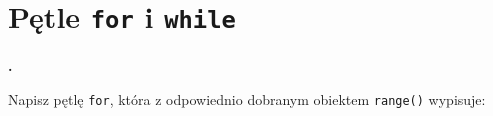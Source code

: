 \documentclass[a4paper]{article}
\begin{document}



















\section{Pętle \texttt{for} i \texttt{while}}
\textbf{.}\addtocounter{zadanie}{1} Napisz pętlę \verb|for|, która z odpowiednio dobranym obiektem \verb|range()| wypisuje:
\end{document}
